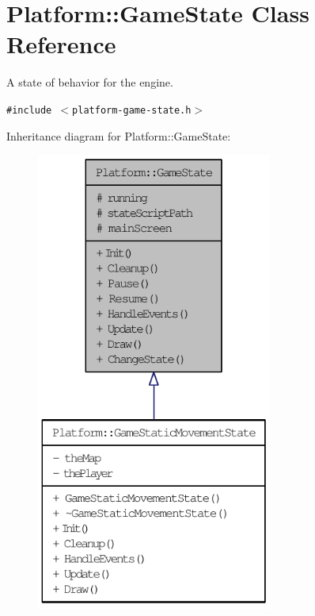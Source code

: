 \hypertarget{class_platform_1_1_game_state}{
\section{Platform::GameState Class Reference}
\label{d4/d4f/class_platform_1_1_game_state}
}
A state of behavior for the engine.  


{\tt \#include $<$platform-game-state.h$>$}

Inheritance diagram for Platform::GameState:\nopagebreak
\begin{figure}[H]
\begin{center}
\leavevmode
\includegraphics[width=220pt]{de/d37/class_platform_1_1_game_state__inherit__graph}
\end{center}
\end{figure}
